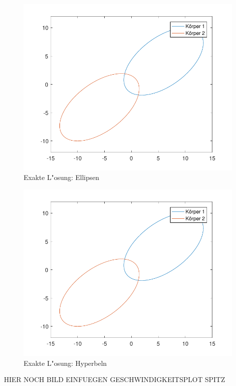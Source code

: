 \begin{refsection}
\begin{figure}
\centering
\includegraphics{schrittlaenge/images/ellipseOptimal.pdf}
\caption{Exakte L"osung: Ellipsen}
\label{ellipseOptimalImage}
\end{figure}

\begin{figure}
\centering
\includegraphics{schrittlaenge/images/ellipseOptimal.pdf}
\caption{Exakte L"osung: Hyperbeln}
\label{hyperbelOptimalImage}
\end{figure}

HIER NOCH BILD EINFUEGEN GESCHWINDIGKEITSPLOT SPITZ


\end{refsection}

